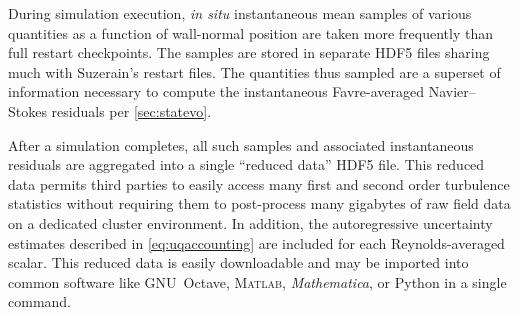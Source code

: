 During simulation execution, \emph{in situ} instantaneous mean samples
of various quantities as a function of wall-normal position are taken
more frequently than full restart checkpoints.  The samples are stored
in separate HDF5 files sharing much with Suzerain's restart files.
The quantities thus sampled are a superset of information necessary to
compute the instantaneous Favre-averaged Navier--Stokes residuals per
\autoref{sec:statevo}.

After a simulation completes, all such samples and associated instantaneous
residuals are aggregated into a single ``reduced data'' HDF5 file.  This reduced
data permits third parties to easily access many first and second order
turbulence statistics without requiring them to post-process many gigabytes of
raw field data on a dedicated cluster environment.  In addition, the
autoregressive uncertainty estimates described in \autoref{eq:uqaccounting} are
included for each Reynolds-averaged scalar.  This reduced data is easily
downloadable and may be imported into common software like GNU~Octave,
\textsc{Matlab}\textsuperscript{\textregistered}, \textit{Mathematica}\textsuperscript{\textregistered}, or
Python in a single command.
